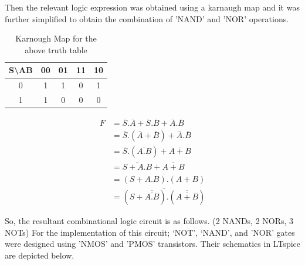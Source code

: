 \documentclass[a4paper,11pt]{article}%
\begin{document}
Then the relevant logic expression was obtained using a karnaugh map and it was further simplified to obtain the combination of 'NAND' and 'NOR' operations.

\begin{table}[H]
	\centering
	\begin{tabular}{c |c| c| c| c}
		S\textbackslash AB & 00 & 01 & 11 & 10\\\hline
		0 & 1 & 1 & 0 & 1\\\hline
		1 & 1 & 0  &0  & 0
	\end{tabular}
	\caption{Karnough Map for the above truth table}
\end{table}

\[
\begin{split}
	F &= \overline{S}.\overline{A} + \overline{S}.\overline{B} + \overline{A}.\overline{B}\\
	&= \overline{S}.(\overline{A}+\overline{B}) + \overline{A}.\overline{B}\\
	&= \overline{S}.(\overline{A.B}) + \overline{A+B}\\
	&= \overline{S+A.B} + \overline{A+B}\\
	& = \overline{(S + A.B).(A+B)}\\
	& =\overline{(S + \overline{\overline{A.B}}).(\overline{\overline{A+B}})}
\end{split}
\]



So, the resultant combinational logic circuit is as follows. (2 NANDs, 2 NORs, 3 NOTs) For the implementation of this circuit; ‘NOT’, ‘NAND’, and 'NOR' gates were designed using 'NMOS' and 'PMOS' transistors. Their schematics in LTspice are depicted below.
\end{document}
